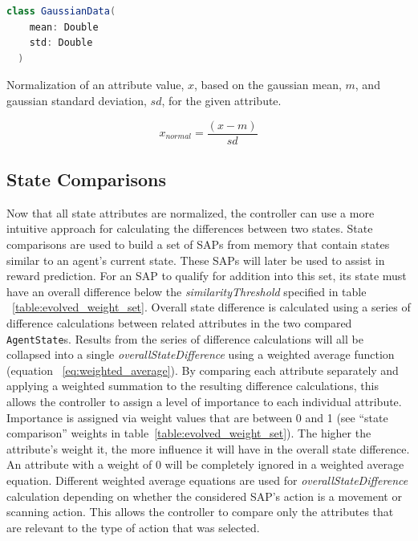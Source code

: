 \begin{lstlisting}[language=Scala, label=code:gaussian_data]
  class GaussianData(
    mean: Double
    std: Double
  )
\end{lstlisting}

\caption{Normalization of an attribute value, $x$, based on the gaussian mean, $m$, and gaussian standard deviation, $sd$, for the given attribute.}
\begin{equation} \label{eq:gaussian_normalize}
  x_{normal} = \frac{(x - m)}{sd}
\end{equation}



\subsection{State Comparisons}
Now that all state attributes are normalized, the controller can use a more intuitive approach for calculating the differences between two states.
State comparisons are used to build a set of SAPs from memory that contain states similar to an agent's current state.
These SAPs will later be used to assist in reward prediction.
For an SAP to qualify for addition into this set, its state must have an overall difference below the \textit{similarityThreshold} specified in table ~\ref{table:evolved_weight_set}.
Overall state difference is calculated using a series of difference calculations between related attributes in the two compared \texttt{AgentState}s.
Results from the series of difference calculations will all be collapsed into a single \textit{overallStateDifference} using a weighted average function (equation ~\ref{eq:weighted_average}).
By comparing each attribute separately and applying a weighted summation to the resulting difference calculations, this allows the controller to assign a level of importance to each individual attribute.
Importance is assigned via weight values that are between 0 and 1 (see ``state comparison'' weights in table~\ref{table:evolved_weight_set}).
The higher the attribute's weight it, the more influence it will have in the overall state difference.
An attribute with a weight of 0 will be completely ignored in a weighted average equation.
Different weighted average equations are used for \textit{overallStateDifference} calculation depending on whether the considered SAP's action is a movement or scanning action.
This allows the controller to compare only the attributes that are relevant to the type of action that was selected.

